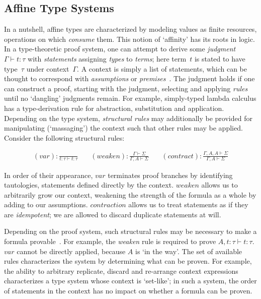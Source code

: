 \subsection{Affine Type Systems}
\label{sec:affine_type_systems}
In a nutshell, affine types are characterized by modeling values as finite resources, operations on which \textit{consume} them. This notion of `affinity' has its roots in logic. In a type-theoretic proof system, one can attempt to derive some \textit{judgment} $\Gamma\vdash{}t:\tau$ with \textit{statements} assigning \textit{types} to \textit{terms}; here term~$t$ is stated to have type~$\tau$ under context~$\Gamma$. A context is simply a list of statements, which can be thought to correspond with \textit{assumptions} or \textit{premises}~\cite{nederpelt2014type}. The judgment holds if one can construct a proof, starting with the judgment, selecting and applying \textit{rules} until no `dangling' judgments remain. For example, simply-typed lambda calculus has a type-derivation rule for abstraction, substitution and application. Depending on the type system, \textit{structural rules} may additionally be provided for manipulating (`massaging') the context such that other rules may be applied. Consider the following structural rules:

\[
\begin{aligned}
(var): \frac{}{t:\tau \vdash t: \tau}
&\quad
(weaken): \frac{\Gamma \vdash \Sigma}{\Gamma, A \vdash \Sigma}
&\quad
(contract): \frac{\Gamma, A, A \vdash \Sigma}{\Gamma, A \vdash \Sigma}
\end{aligned}
\]

In order of their appearance, $var$ terminates proof branches by identifying tautologies, statements defined directly by the context. $weaken$ allows us to arbitrarily grow our context, weakening the strength of the formula as a whole by adding to our assumptions. $contraction$ allows us to treat statements as if they are \textit{idempotent}; we are allowed to discard duplicate statements at will. 

Depending on the proof system, such structural rules may be necessary to make a formula provable~\cite{nederpelt2014type}. For example, the \textit{weaken} rule is required to prove $A, t:\tau\vdash t:\tau$. $var$ cannot be directly applied, because $A$ is `in the way'. The set of available rules characterizes the system by determining what can be proven. For example, the ability to arbitrary replicate, discard and re-arrange context expressions characterizes a type system whose context is `set-like'; in such a system, the order of statements in the context has no impact on whether a formula can be proven.

